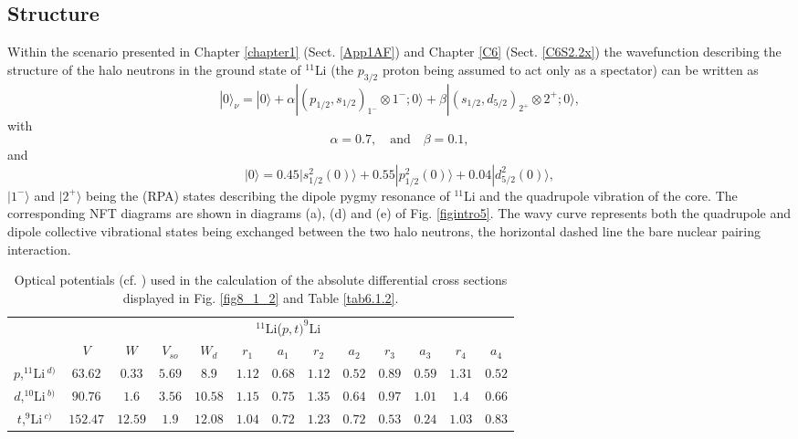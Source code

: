 \subsection{Structure}
Within the scenario presented in Chapter \ref{chapter1}  (Sect. \ref{App1AF}) and Chapter \ref{C6} (Sect. \ref{C6S2.2x}) the wavefunction describing the structure of the halo neutrons in the ground state of $^{11}$Li (the $p_{3/2}$ proton being assumed to act only as a spectator) can be written as
\begin{equation}\label{eq8_2_1}
|0\rangle_\nu=|0\rangle+\alpha|(p_{1/2},s_{1/2})_{1^-}\otimes 1^-;0\rangle+\beta|(s_{1/2},d_{5/2})_{2^+}\otimes 2^+;0\rangle,
\end{equation}
with
\begin{equation}\label{eq8_2_2}
\alpha=0.7,\quad \text{and} \quad \beta=0.1,
\end{equation}
and
\begin{equation}\label{eq8_2_3}
|0\rangle=0.45|s_{1/2}^2(0)\rangle+0.55|p_{1/2}^2(0)\rangle+0.04|d_{5/2}^2(0)\rangle,
\end{equation}
$|1^-\rangle$ and $|2^+\rangle$ being the (RPA) states describing the dipole pygmy resonance of $^{11}$Li and the quadrupole vibration of the core. The corresponding NFT diagrams are shown in diagrams (a), (d) and (e) of Fig. \ref{figintro5}. The wavy curve represents both the quadrupole and dipole collective vibrational states being exchanged between the two halo neutrons, the horizontal dashed line the bare nuclear pairing interaction.




\begin{table}[h!]
{\begin{tabular}{|c|c|c|c|c|c|c|c|c|c|c|c|c|}
\cline{2-13} 
\multicolumn{1}{c|}{}& \multicolumn{12}{|c|}{$^{11}$Li($p,t)^{9}$Li}           \\
\cline{2-13} 
\multicolumn{1}{c|}{} & $V$ & $W$ &  $V_{so}$ &  $W_d$ &  $r_1$ &  $a_1$ &  $r_2$ &  $a_2$ &  $r_3$ &  $a_3$ &  $r_4$ &  $a_4$            \\
\hline 
$p$,\;$^{11}$Li$\,^{d)}$ & $63.62$ & $0.33$ &  $5.69$ &  $8.9$ &  $1.12$ &  $0.68$ &  $1.12$ &  $0.52$ &  $0.89$ &  $0.59$ &  $1.31$ &  $0.52$ \\
\hline 
$d$,\;$^{10}$Li$\,^{b)}$ & $90.76$ & $1.6$ &  $3.56$ &  $10.58$ &  $1.15$ &  $0.75$ &  $1.35$ &  $0.64$ &  $0.97$ &  $1.01$ &  $1.4$ &  $0.66$ \\
\hline 
$t$,\;$^{9}$Li$\,^{c)}$ & $152.47$ & $12.59$ &  $1.9$ &  $12.08$ &  $1.04$ &  $0.72$ &  $1.23$ &  $0.72$ &  $0.53$ &  $0.24$ &  $1.03$ &  $0.83$ \\
\hline 

\hline 
  \end{tabular}}
   \caption{Optical potentials (cf. \cite{Tanihata:08}) used in the calculation of the absolute differential cross sections displayed in Fig. \ref{fig8_1_2} and Table \ref{tab6.1.2}.}
\label{tab8.1.1}
\end{table}



